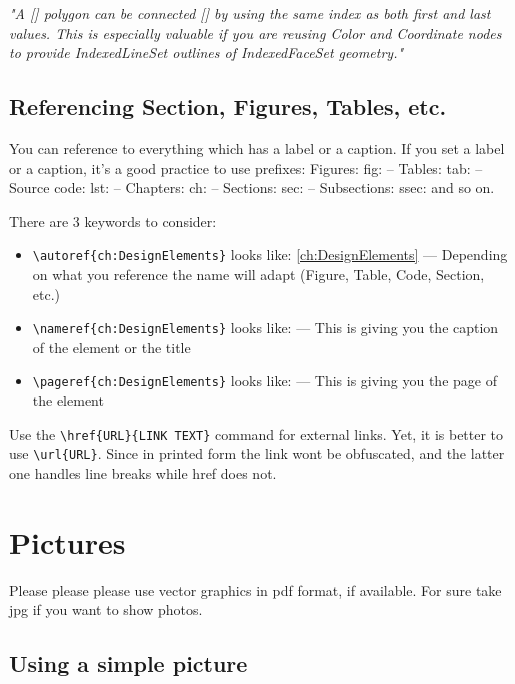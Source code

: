 \begin{displayquote}
\textit{"A [\textellipsis] polygon can be connected [\textellipsis] by using the same index as both first and last values. This is especially valuable if you are reusing Color and Coordinate nodes to provide IndexedLineSet outlines of IndexedFaceSet geometry." \parencite[162]{Desilver2017}}
\end{displayquote}

\subsection{Referencing Section, Figures, Tables, etc.}

You can reference to everything which has a label or a caption. If you set a label or a caption, it’s a good practice to use prefixes: Figures: fig: -- Tables: tab: -- Source code: lst: -- Chapters: ch: -- Sections: sec: -- Subsections: ssec: and so on.

There are 3 keywords to consider:

\begin{itemize}
	\setlength\itemsep{-0.75em} %
	\item \verb|\autoref{ch:DesignElements}| looks like: \autoref{ch:DesignElements} --- Depending on what you reference the name will adapt (Figure, Table, Code, Section, etc.)
	\item \verb|\nameref{ch:DesignElements}| looks like:  --- This is giving you the caption of the element or the title
	\item \verb|\pageref{ch:DesignElements}| looks like: \pageref{ch:DesignElements} --- This is giving you the page of the element
\end{itemize}

Use the \verb|\href{URL}{LINK TEXT}| command for external links. Yet, it is better to use \verb|\url{URL}|. Since in printed form the link wont be obfuscated, and the latter one handles line breaks while href does not.

\section{Pictures}

Please please please use vector graphics in pdf format, if available. For sure take jpg if you want to show photos.

\subsection{Using a simple picture}

